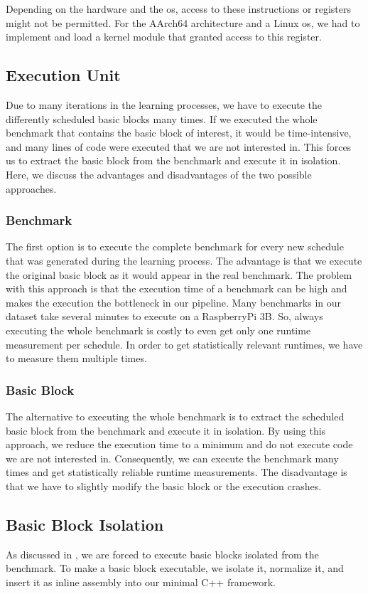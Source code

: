 Depending on the hardware and the \ac{os}, access to these instructions or registers might not be permitted.
For the AArch64 architecture and a Linux \ac{os}, we had to implement and load a kernel module that granted access to this register.
 
\subsection{Execution Unit}
\label{sec:approach:exec_unit}
Due to many iterations in the learning processes, we have to execute the differently scheduled basic blocks many times.
If we executed the whole benchmark that contains the basic block of interest, it would be time-intensive, and many lines of code were executed that we are not interested in.
This forces us to extract the basic block from the benchmark and execute it in isolation.
Here, we discuss the advantages and disadvantages of the two possible approaches.

\subsubsection{Benchmark}
The first option is to execute the complete benchmark for every new schedule that was generated during the learning process.
The advantage is that we execute the original basic block as it would appear in the real benchmark.
The problem with this approach is that the execution time of a benchmark can be high and makes the execution the bottleneck in our pipeline.
Many benchmarks in our dataset take several minutes to execute on a RaspberryPi 3B.
So, always executing the whole benchmark is costly to even get only one runtime measurement per schedule.
In order to get statistically relevant runtimes, we have to measure them multiple times.

\subsubsection{Basic Block}
The alternative to executing the whole benchmark is to extract the scheduled basic block from the benchmark and execute it in isolation.
By using this approach, we reduce the execution time to a minimum and do not execute code we are not interested in.
Consequently, we can execute the benchmark many times and get statistically reliable runtime measurements.
The disadvantage is that we have to slightly modify the basic block or the execution crashes.

\subsection{Basic Block Isolation}
\label{sec:approach:bbisolation}
As discussed in , we are forced to execute basic blocks isolated from the benchmark.
To make a basic block executable, we isolate it, normalize it, and insert it as inline assembly into our minimal C++ framework.

